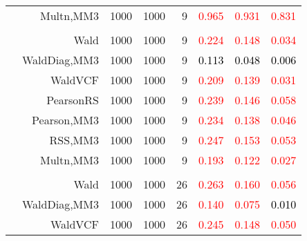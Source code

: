 \documentclass[
]{article}
\begin{document}
\begin{table}[H]
{\begin{tabular}[t]{lrrrrrrr}
\hspace{1em} & Multn,MM3 & 1000 & 1000 & 9 & \textcolor{red}{0.965} & \textcolor{red}{0.931} & \textcolor{red}{0.831}\\
\cmidrule{1-8}
\addlinespace[0.3em]
\multicolumn{8}{l}{\textbf{2F 10V}}\\
\hspace{1em} & Wald & 1000 & 1000 & 9 & \textcolor{red}{0.224} & \textcolor{red}{0.148} & \textcolor{red}{0.034}\\

\hspace{1em} & WaldDiag,MM3 & 1000 & 1000 & 9 & \textcolor{black}{0.113} & \textcolor{black}{0.048} & \textcolor{black}{0.006}\\

\hspace{1em} & WaldVCF & 1000 & 1000 & 9 & \textcolor{red}{0.209} & \textcolor{red}{0.139} & \textcolor{red}{0.031}\\

\hspace{1em} & PearsonRS & 1000 & 1000 & 9 & \textcolor{red}{0.239} & \textcolor{red}{0.146} & \textcolor{red}{0.058}\\

\hspace{1em} & Pearson,MM3 & 1000 & 1000 & 9 & \textcolor{red}{0.234} & \textcolor{red}{0.138} & \textcolor{red}{0.046}\\

\hspace{1em} & RSS,MM3 & 1000 & 1000 & 9 & \textcolor{red}{0.247} & \textcolor{red}{0.153} & \textcolor{red}{0.053}\\

\hspace{1em} & Multn,MM3 & 1000 & 1000 & 9 & \textcolor{red}{0.193} & \textcolor{red}{0.122} & \textcolor{red}{0.027}\\
\cmidrule{1-8}
\addlinespace[0.3em]
\multicolumn{8}{l}{\textbf{3F 15V}}\\
\hspace{1em} & Wald & 1000 & 1000 & 26 & \textcolor{red}{0.263} & \textcolor{red}{0.160} & \textcolor{red}{0.056}\\

\hspace{1em} & WaldDiag,MM3 & 1000 & 1000 & 26 & \textcolor{red}{0.140} & \textcolor{red}{0.075} & \textcolor{black}{0.010}\\

\hspace{1em} & WaldVCF & 1000 & 1000 & 26 & \textcolor{red}{0.245} & \textcolor{red}{0.148} & \textcolor{red}{0.050}\\


\end{tabular}}
\end{table}
\end{document}
